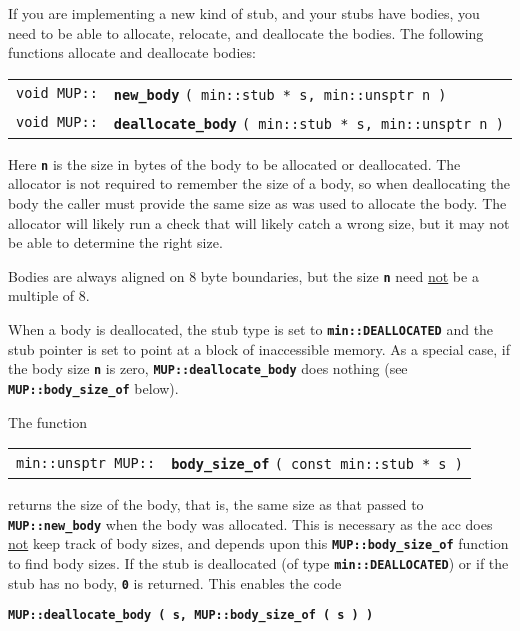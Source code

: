 \documentclass[12pt]{article}
\makeatletter
\newcommand{\TT}[1]{{\tt \bfseries #1}}
\newcommand{\ttindex}[1]{\index{#1@{\tt #1}}}
\newcommand{\EOL}{\penalty \exhyphenpenalty}
\newenvironment{indpar}[1][0.3in]%
	{\begin{list}{}%
		     {\setlength{\itemsep}{0in}%
		      \setlength{\topsep}{0in}%
		      \setlength{\parsep}{1ex}%
		      \setlength{\labelwidth}{#1}%
		      \setlength{\leftmargin}{#1}%
		      \addtolength{\leftmargin}{\labelsep}}%
	 \item}%
	{\end{list}}
\newcommand{\LABEL}[1]{\label{#1}}
\newcommand{\MUPKEY}[1]%
	   {\TT{#1}\ttindex{MUP::#1}\ttindex{#1}}
\makeatother
\begin{document}
If you are implementing a new kind of stub, and your stubs have bodies,
you need to be able to allocate, relocate, and deallocate the bodies.
The following functions allocate and deallocate bodies:

\begin{indpar}\begin{tabular}{@{}r@{}l@{}}
\verb|void MUP::|
    & \MUPKEY{new\_body} \verb|( min::stub * s, min::unsptr n )|
\LABEL{MUP::NEW_BODY} \\
\verb|void MUP::|
    & \MUPKEY{deallocate\_body} \verb|( min::stub * s, min::unsptr n )|
\LABEL{MUP::DEALLOCATE_BODY} \\
\end{tabular}\end{indpar}

Here \TT{n} is the size in bytes of the body to be allocated or deallocated.
The allocator is not required to remember the size of a body,
so when deallocating the body the caller must provide the same size
as was used to allocate the body.  The allocator will likely
run a check that will likely catch a wrong size, but it may not
be able to determine the right size.

Bodies are always aligned on 8 byte boundaries, but the size \TT{n}
need \underline{not} be a multiple of 8.

When a body is deallocated, the stub type is set to
\TT{min::DEALLOCATED} and the stub pointer is set to
point at a block of inaccessible memory.
As a special case, if the body size \TT{n} is zero,
\TT{MUP::\EOL deallocate\_\EOL body} does nothing
(see \TT{MUP::\EOL body\_\EOL size\_\EOL of} below).


The function

\begin{indpar}\begin{tabular}{@{}r@{}l@{}}
\verb|min::unsptr MUP::|
    & \MUPKEY{body\_size\_of} \verb|( const min::stub * s )|
\LABEL{MUP::BODY_SIZE_OF} \\
\end{tabular}\end{indpar}

returns the size of the body, that is, the same size
as that passed to \TT{MUP::new\_\EOL body} when the
body was allocated.  This is necessary as the acc does
\underline{not} keep track of body sizes, and depends upon
this \TT{MUP::body\_\EOL size\_\EOL of} function to
find body sizes.  If the stub is deallocated (of type
\TT{min::DEALLOCATED}) or if the stub has no body,
\TT{0} is returned.  This enables the code
\begin{center}
\TT{MUP::deallocate\_body ( s, MUP::body\_size\_of ( s ) )}
\end{center}
\end{document}
